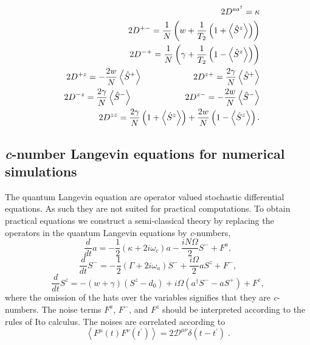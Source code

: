 \documentclass[aps,
twocolumn,
showpacs,
superscriptaddress,groupedaddress]{revtex4}
\begin{document}
\begin{eqnarray}
&& 2D^{a a^{\dagger}}= \kappa \nonumber \\
&& 2D^{+-}= \frac{1}{N}
\left(
  w + \frac{1}{T_2} \left(1 + \left< \hat{S}^{z} \right> \right)
\right) \nonumber \\
&& 2D^{-+}= \frac{1}{N}
\left(
  \gamma + \frac{1}{T_2} \left(1- \left< \hat{S}^{z} \right> \right)
\right) \nonumber \\
&& 2D^{+z}= -\frac{2w}{N} \left< \hat{S}^{+} \right>
\hspace{0.83in} 2D^{z+}= \frac{2\gamma}{N} \left< \hat{S}^{+} \right>
\nonumber \\
&& 2D^{-z}= \frac{2\gamma}{N} \left< \hat{S}^{-} \right>
\hspace{0.86in} 2D^{z-}= -\frac{2w}{N} \left< \hat{S}^{-} \right>
\nonumber \\
&& 2D^{zz}= \frac{2\gamma}{N}
\left(1+ \left< \hat{S}^{z} \right> \right) +
\frac{2w}{N}\left(1- \left< \hat{S}^{z} \right> \right).
\label{OpNoise1}
\end{eqnarray}


\subsection{{\it c}-number Langevin equations for numerical simulations}

The quantum Langevin equation are operator valued stochastic
differential equations.  As such they are not suited for practical
computations.  To obtain practical equations we construct a
semi-classical theory by replacing the operators in the quantum Langevin
equations by {\it c}-numbers,
\begin{equation}
\frac{d}{dt} a= -\frac{1}{2}  (\kappa +2i\omega_c) a
-\frac{i N \Omega}{2} S^{-}
+F^{a},
\label{Lac}
\end{equation}
\begin{equation}
\frac{d}{dt} S^{-} = -\frac{1}{2}  \left(\Gamma +2 i \omega_a \right)  S^{-}
+\frac{i \Omega}{2} a S^{z}
+F^{-},
\end{equation}
\begin{equation}
\frac{d}{dt} S^{z} = -(w+\gamma)\left( S^{z} - d_0\right)
+i\Omega \left( a^{\dagger}S^{-} - a S^{+} \right)
\label{Lszc}
+F^{z},
\end{equation}
where the omission of the hats over the variables signifies that they
are {\it c}-numbers.  The noise terms $F^a$, $F^-$, and $F^z$ should be
interpreted according to the rules of Ito calculus.  The noises are
correlated according to
\begin{equation}
\left< F^{\mu}(t) F^{\nu}(t^{\prime})\right> =
2 \mathscr{D}^{\mu \nu} \delta(t-t^{\prime})\;.
\label{ClassicalDiffusion1}
\end{equation}
\end{document}
